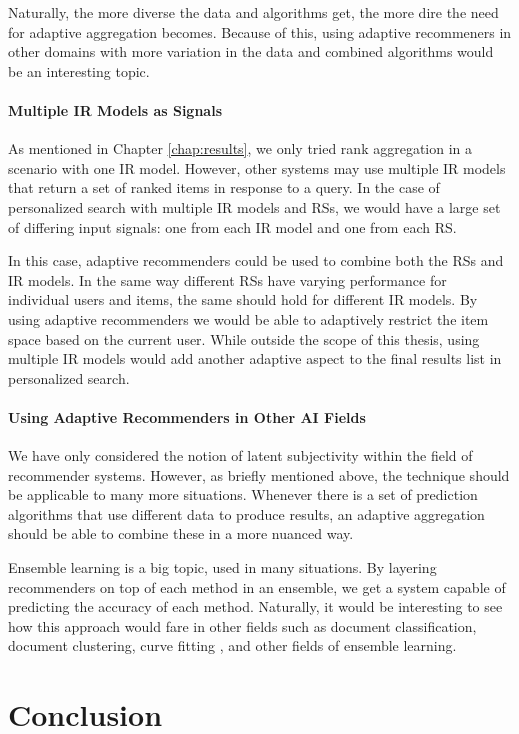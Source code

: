 Naturally, the more diverse the data and algorithms get,
the more dire the need for adaptive aggregation becomes.
Because of this, using adaptive recommeners in other domains with more variation 
in the data and combined algorithms would be an interesting topic.


\paragraph{Multiple IR Models as Signals}
As mentioned in Chapter \ref{chap:results},
we only tried rank aggregation in a scenario with one IR model.
However, other systems may use multiple IR models
that return a set of ranked items in response to a query.
In the case of personalized search with multiple IR models
and RSs, we would have a large set of differing
input signals:
one from each IR model and one from each RS.

In this case, adaptive recommenders could be used to combine
both the RSs and IR models.
In the same way different RSs have varying performance
for individual users and items, the same should hold
for different IR models.
By using adaptive recommenders we would be able
to adaptively restrict the item space based on the 
current user.
While outside the scope of this thesis,
using multiple IR models would add another adaptive
aspect to the final results list in personalized search.


\paragraph{Using Adaptive Recommenders in Other AI Fields}
We have only considered the notion of latent subjectivity within the field of recommender systems.
However, as briefly mentioned above, the technique should be applicable to many more situations.
Whenever there is a set of prediction algorithms that use different data to produce results,
an adaptive aggregation should be able to combine these in a more nuanced way.

Ensemble learning is a big topic, used in many situations.
By layering recommenders on top of each method in an ensemble, 
we get a system capable of predicting the accuracy of each method.
Naturally, it would be interesting to see how this approach would fare
in other fields such as document classification, document clustering,
curve fitting \cite[p7]{Polikar2006}, and other fields of ensemble learning.


\clearpage
\section{Conclusion}

